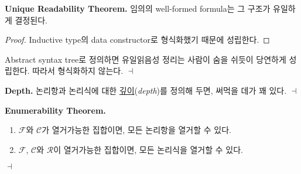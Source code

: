 \documentclass[12pt]{paper}
\newenvironment{context}[1][]
{ \noindent \textbf{{#1}.} }
{ \hfill $ \dashv $ }
\begin{document}
\newpage

\begin{context}[Unique Readability Theorem]
임의의 well-formed formula는 그 구조가 유일하게 결정된다.
\begin{proof}
Inductive type의 data constructor로 형식화했기 때문에 성립한다.
\end{proof}
\noindent Abstract syntax tree로 정의하면 유일읽음성 정리는 사람이 숨을 쉬듯이 당연하게 성립한다.
따라서 형식화하지 않는다.
\end{context}

\begin{context}[Depth]
논리항과 논리식에 대한 \underline{깊이}(\textit{depth})를 정의해 두면, 써먹을 데가 꽤 있다.
\end{context}

\begin{context}[Enumerability Theorem]
\begin{enumerate}
\item $\mathcal{F}$와 $\mathcal{C}$가 열거가능한 집합이면, 모든 논리항을 열거할 수 있다.
\item $\mathcal{F}$, $\mathcal{C}$와 $\mathcal{R}$이 열거가능한 집합이면, 모든 논리식을 열거할 수 있다.
\end{enumerate}
\end{context}
\end{document}
